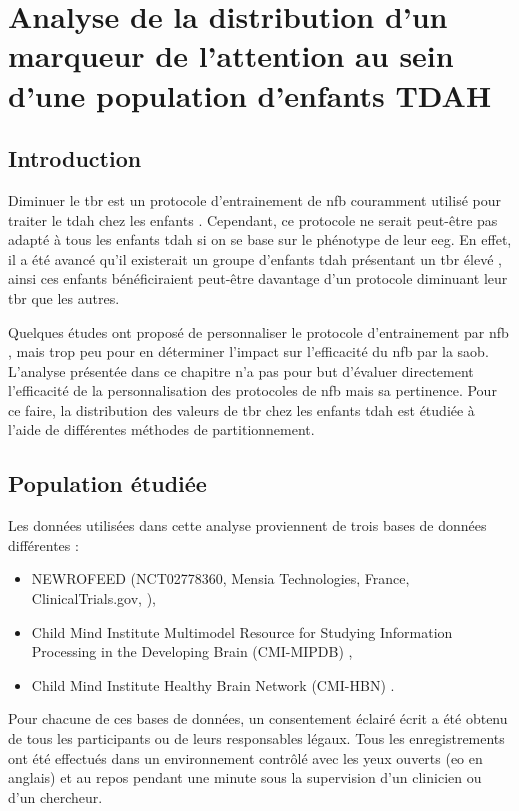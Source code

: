 \chapter{Analyse de la distribution d'un marqueur de l'attention au sein d'une population d'enfants TDAH}

\section*{Introduction}
Diminuer le \gls{tbr} est un protocole d'entrainement de \gls{nfb} couramment utilisé pour traiter le \gls{tdah} chez les enfants 
\citep{Arnold2014, Deilami2016, Gevensleben2009, VanDongen2013}. Cependant, ce protocole ne serait peut-être pas adapté à tous les enfants \gls{tdah} si 
on se base sur le phénotype de leur \gls{eeg}. En effet, il a été avancé qu'il existerait un groupe d'enfants \gls{tdah} présentant un \gls{tbr} élevé 
\citep{Zhang2017, Clarke2011}, ainsi ces enfants bénéficiraient peut-être davantage d'un protocole diminuant leur \gls{tbr} que les autres. 

Quelques études ont proposé de personnaliser le protocole d'entrainement par \gls{nfb} \citep{Bazanova2018, Escolano2014}, mais trop peu pour en déterminer
l'impact sur l'efficacité du \gls{nfb} par la \gls{saob}. L'analyse présentée dans ce chapitre n'a pas pour but d'évaluer directement l'efficacité de la 
personnalisation des protocoles de \gls{nfb} mais sa pertinence. Pour ce faire, la distribution des valeurs de \gls{tbr} chez les enfants \gls{tdah} est 
étudiée à l'aide de différentes méthodes de partitionnement. 


\section{Population étudiée}

Les données utilisées dans cette analyse proviennent de trois bases de données différentes :
\begin{itemize}
\item NEWROFEED (NCT02778360, Mensia Technologies, France, ClinicalTrials.gov, \citep{Bioulac2019}),
\item Child Mind Institute Multimodel Resource for Studying Information Processing in the Developing Brain (CMI-MIPDB) \citep{Langer2017, Langer2017b},
\item Child Mind Institute Healthy Brain Network (CMI-HBN) \citep{Alexander2017, Alexander2017b}.
\end{itemize}
Pour chacune de ces bases de données, un consentement éclairé écrit a été obtenu de tous les participants ou de leurs responsables légaux. Tous les enregistrements
ont été effectués dans un environnement contrôlé avec les yeux ouverts (\gls{eo} en anglais) et au repos pendant une minute sous la supervision d'un clinicien ou d'un chercheur. 

